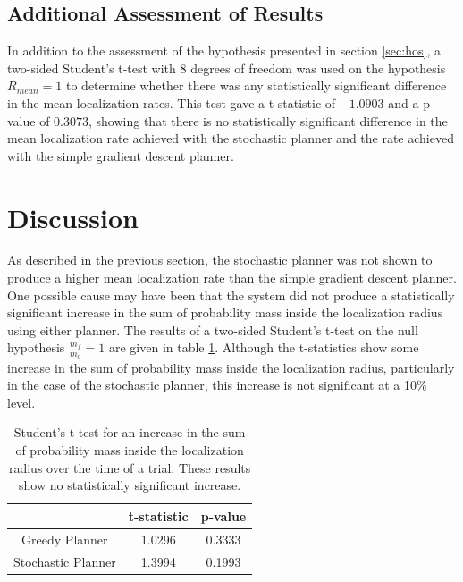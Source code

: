 \documentclass[submit, 12pt]{aiaa-pretty-modified}
\begin{document}
\subsection{Additional Assessment of Results}
\label{sec:additional}
In addition to the assessment of the hypothesis presented in section \ref{sec:hos}, a two-sided Student's
t-test with 8 degrees of freedom was used on the hypothesis $R_{mean}
= 1$ to determine whether there was any statistically significant
difference in the mean localization rates.  This test gave
a t-statistic of $-1.0903$ and a p-value of $0.3073$, showing that
there is no statistically significant difference in the mean localization
rate achieved with the stochastic planner and the rate achieved with
the simple gradient descent planner.

\section{Discussion}
As described in the previous section, the stochastic planner was not
shown to produce a higher mean localization
rate than the simple gradient descent planner.  One possible cause may
have been
that the system did not produce a statistically significant increase
in the sum of probability mass inside the localization radius using
either planner.  The results of a two-sided Student's t-test on the
null hypothesis $\frac{m_f}{m_0} = 1$ are given in table
\ref{tab:nofind}.  Although the t-statistics show some increase in the
sum of probability mass inside the localization radius,
particularly in the case of the stochastic planner, this increase is
not significant at a 10\% level.

\begin{table}[htb]
\begin{center}
\begin{tabular}{|c||c|c|}
\hline
& t-statistic & p-value \\
\hline \hline
Greedy Planner & 1.0296 & 0.3333\\
\hline
Stochastic Planner& 1.3994 &0.1993\\
\hline
\end{tabular}
\caption[Student's t-test on probability mass increase inside
localization radius.]{Student's t-test for an increase in the sum of probability
  mass inside the localization radius over the time of a trial.
  These results show no statistically significant increase. \label{tab:nofind} }
\end{center}
\end{table}
\end{document}
